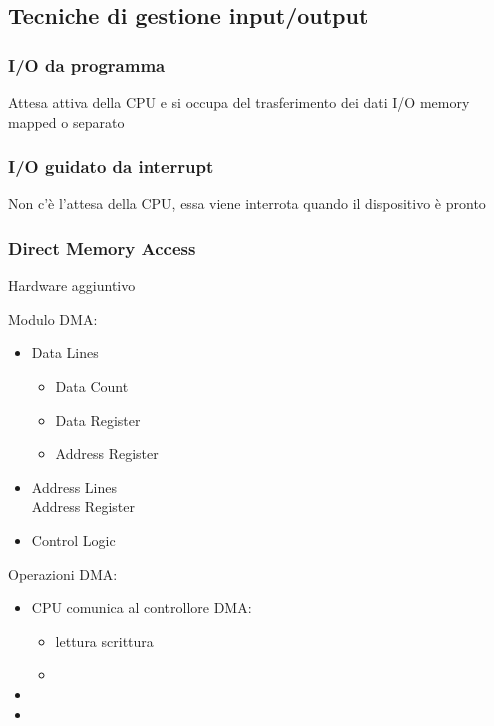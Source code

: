 \documentclass[arch.tex]{subfiles}
\begin{document}
\subsection{Tecniche di gestione input/output}%
\label{sub:tecniche_di_gestione_input_output}

\subsubsection{I/O da programma}
Attesa attiva della CPU e si occupa del trasferimento dei dati 
I/O memory mapped o separato

\subsubsection{I/O guidato da interrupt}
Non c'è l'attesa della CPU, essa viene interrota quando il dispositivo è pronto

\subsubsection{Direct Memory Access}
Hardware aggiuntivo

Modulo DMA:

\begin{itemize}
	\item Data Lines
		\begin{itemize}
			\item Data Count
			\item Data Register
			\item Address Register
		\end{itemize}
	\item Address Lines\\
		Address Register
	\item Control Logic
\end{itemize}

Operazioni DMA:

\begin{itemize}
	\item CPU comunica al controllore DMA:

		\begin{itemize}
			\item lettura scrittura
			\item 
		\end{itemize}
	\item 
	\item 
\end{itemize}
\end{document}
